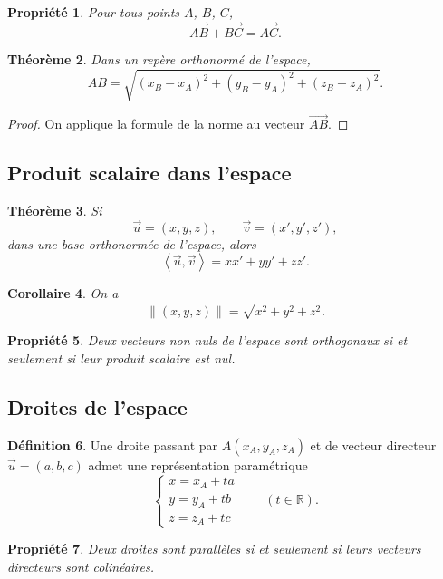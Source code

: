 \documentclass[11pt,a4paper]{article}
\newcommand{\R}{\mathbb{R}}
\newcommand{\norme}[1]{\left\|#1\right\|}
\newcommand{\ps}[2]{\left\langle #1,#2\right\rangle}
\newcommand{\uu}{\overrightarrow{u}}
\newcommand{\vv}{\overrightarrow{v}}
\theoremstyle{definition}
\newtheorem{definition}{Définition}[section]
\theoremstyle{plain}
\newtheorem{propriete}[definition]{Propriété}
\newtheorem{theoreme}[definition]{Théorème}
\newtheorem{corollaire}[definition]{Corollaire}
\begin{document}
\begin{propriete}
Pour tous points $A$, $B$, $C$,
\[
\overrightarrow{AB}+\overrightarrow{BC}=\overrightarrow{AC}.
\]
\end{propriete}

\begin{theoreme}
Dans un repère orthonormé de l'espace,
\[
AB=\sqrt{(x_B-x_A)^2+(y_B-y_A)^2+(z_B-z_A)^2}.
\]
\end{theoreme}

\begin{proof}
On applique la formule de la norme au vecteur $\overrightarrow{AB}$.
\end{proof}

\subsection{Produit scalaire dans l'espace}

\begin{theoreme}
Si
\[
\uu=(x,y,z),\qquad \vv=(x',y',z'),
\]
dans une base orthonormée de l'espace, alors
\[
\ps{\uu}{\vv}=xx'+yy'+zz'.
\]
\end{theoreme}

\begin{corollaire}
On a
\[
\norme{(x,y,z)}=\sqrt{x^2+y^2+z^2}.
\]
\end{corollaire}

\begin{propriete}
Deux vecteurs non nuls de l'espace sont orthogonaux si et seulement si leur produit scalaire est nul.
\end{propriete}

\subsection{Droites de l'espace}

\begin{definition}
Une droite passant par $A(x_A,y_A,z_A)$ et de vecteur directeur $\uu=(a,b,c)$ admet une représentation paramétrique
\[
\left\{
\begin{array}{l}
x=x_A+ta\\
y=y_A+tb\\
z=z_A+tc
\end{array}
\right.
\qquad (t\in\R).
\]
\end{definition}

\begin{propriete}
Deux droites sont parallèles si et seulement si leurs vecteurs directeurs sont colinéaires.
\end{propriete}
\end{document}

